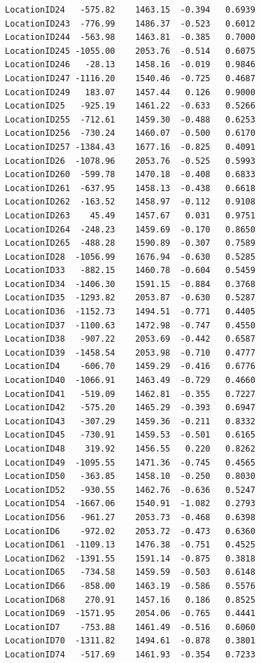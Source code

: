 \documentclass[12pt,twoside]{reedthesis}
\theoremstyle{definition}
\theoremstyle{definition}
\theoremstyle{definition}
\theoremstyle{remark}
\begin{document}
\begin{verbatim}
LocationID24   -575.82    1463.15  -0.394   0.6939    
LocationID243  -776.99    1486.37  -0.523   0.6012    
LocationID244  -563.98    1463.81  -0.385   0.7000    
LocationID245 -1055.00    2053.76  -0.514   0.6075    
LocationID246   -28.13    1458.16  -0.019   0.9846    
LocationID247 -1116.20    1540.46  -0.725   0.4687    
LocationID249   183.07    1457.44   0.126   0.9000    
LocationID25   -925.19    1461.22  -0.633   0.5266    
LocationID255  -712.61    1459.30  -0.488   0.6253    
LocationID256  -730.24    1460.07  -0.500   0.6170    
LocationID257 -1384.43    1677.16  -0.825   0.4091    
LocationID26  -1078.96    2053.76  -0.525   0.5993    
LocationID260  -599.78    1470.18  -0.408   0.6833    
LocationID261  -637.95    1458.13  -0.438   0.6618    
LocationID262  -163.52    1458.97  -0.112   0.9108    
LocationID263    45.49    1457.67   0.031   0.9751    
LocationID264  -248.23    1459.69  -0.170   0.8650    
LocationID265  -488.28    1590.89  -0.307   0.7589    
LocationID28  -1056.99    1676.94  -0.630   0.5285    
LocationID33   -882.15    1460.78  -0.604   0.5459    
LocationID34  -1406.30    1591.15  -0.884   0.3768    
LocationID35  -1293.82    2053.87  -0.630   0.5287    
LocationID36  -1152.73    1494.51  -0.771   0.4405    
LocationID37  -1100.63    1472.98  -0.747   0.4550    
LocationID38   -907.22    2053.69  -0.442   0.6587    
LocationID39  -1458.54    2053.98  -0.710   0.4777    
LocationID4    -606.70    1459.29  -0.416   0.6776    
LocationID40  -1066.91    1463.49  -0.729   0.4660    
LocationID41   -519.09    1462.81  -0.355   0.7227    
LocationID42   -575.20    1465.29  -0.393   0.6947    
LocationID43   -307.29    1459.36  -0.211   0.8332    
LocationID45   -730.91    1459.53  -0.501   0.6165    
LocationID48    319.92    1456.55   0.220   0.8262    
LocationID49  -1095.55    1471.36  -0.745   0.4565    
LocationID50   -363.85    1458.10  -0.250   0.8030    
LocationID52   -930.55    1462.76  -0.636   0.5247    
LocationID54  -1667.06    1540.91  -1.082   0.2793    
LocationID56   -961.27    2053.73  -0.468   0.6398    
LocationID6    -972.02    2053.72  -0.473   0.6360    
LocationID61  -1109.13    1476.38  -0.751   0.4525    
LocationID62  -1391.55    1591.14  -0.875   0.3818    
LocationID65   -734.58    1459.59  -0.503   0.6148    
LocationID66   -858.00    1463.19  -0.586   0.5576    
LocationID68    270.91    1457.16   0.186   0.8525    
LocationID69  -1571.95    2054.06  -0.765   0.4441    
LocationID7    -753.88    1461.49  -0.516   0.6060    
LocationID70  -1311.82    1494.61  -0.878   0.3801    
LocationID74   -517.69    1461.93  -0.354   0.7233    

\end{verbatim}
\end{document}
